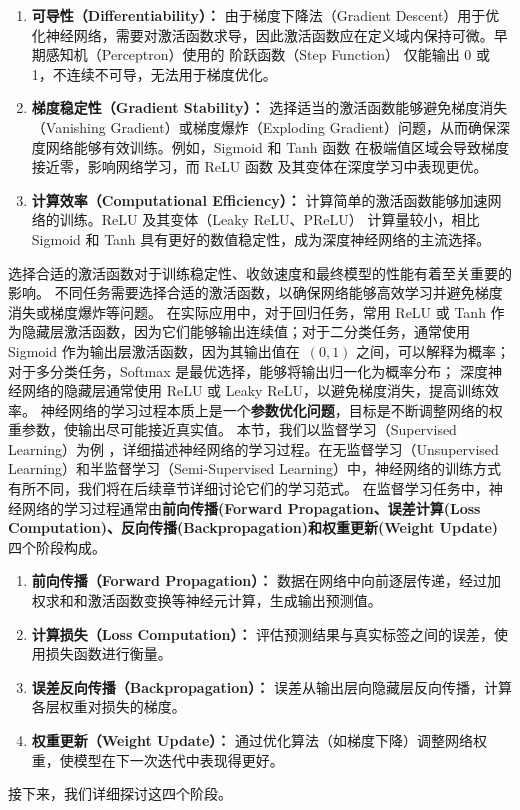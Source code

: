 \begin{enumerate}
\item {\bf  可导性（Differentiability）：} 由于梯度下降法（Gradient Descent）用于优化神经网络，需要对激活函数求导，因此激活函数应在定义域内保持可微。早期感知机（Perceptron）使用的 阶跃函数（Step Function） 仅能输出 0 或 1，不连续不可导，无法用于梯度优化。
\item {\bf  梯度稳定性（Gradient Stability）： }选择适当的激活函数能够避免梯度消失（Vanishing Gradient）或梯度爆炸（Exploding Gradient）问题，从而确保深度网络能够有效训练。例如，Sigmoid 和 Tanh 函数 在极端值区域会导致梯度接近零，影响网络学习，而 ReLU 函数 及其变体在深度学习中表现更优。
\item {\bf  计算效率（Computational Efficiency）：} 计算简单的激活函数能够加速网络的训练。ReLU 及其变体（Leaky ReLU、PReLU） 计算量较小，相比 Sigmoid 和 Tanh 具有更好的数值稳定性，成为深度神经网络的主流选择。
\end{enumerate}
选择合适的激活函数对于训练稳定性、收敛速度和最终模型的性能有着至关重要的影响。
不同任务需要选择合适的激活函数，以确保网络能够高效学习并避免梯度消失或梯度爆炸等问题。 在实际应用中，对于回归任务，常用 ReLU 或 Tanh 作为隐藏层激活函数，因为它们能够输出连续值；对于二分类任务，通常使用 Sigmoid 作为输出层激活函数，因为其输出值在~$(0,1)$ 之间，可以解释为概率；对于多分类任务，Softmax 是最优选择，能够将输出归一化为概率分布；
深度神经网络的隐藏层通常使用 ReLU 或 Leaky ReLU，以避免梯度消失，提高训练效率。
神经网络的学习过程本质上是一个{\bf 参数优化问题}，目标是不断调整网络的权重参数，使输出尽可能接近真实值。
本节，我们以监督学习（Supervised Learning）为例 ，详细描述神经网络的学习过程。在无监督学习（Unsupervised Learning）和半监督学习（Semi-Supervised Learning）中，神经网络的训练方式有所不同，我们将在后续章节详细讨论它们的学习范式。
在监督学习任务中，神经网络的学习过程通常由{\bf 前向传播(Forward Propagation、误差计算(Loss Computation)、反向传播(Backpropagation)和权重更新(Weight Update)}四个阶段构成。
\begin{enumerate}
\item {\bf  前向传播（Forward Propagation）：} 数据在网络中向前逐层传递，经过加权求和和激活函数变换等神经元计算，生成输出预测值。
\item {\bf  计算损失（Loss Computation）： }评估预测结果与真实标签之间的误差，使用损失函数进行衡量。
\item {\bf  误差反向传播（Backpropagation）：} 误差从输出层向隐藏层反向传播，计算各层权重对损失的梯度。
\item {\bf  权重更新（Weight Update）：} 通过优化算法（如梯度下降）调整网络权重，使模型在下一次迭代中表现得更好。
\end{enumerate}
接下来，我们详细探讨这四个阶段。
